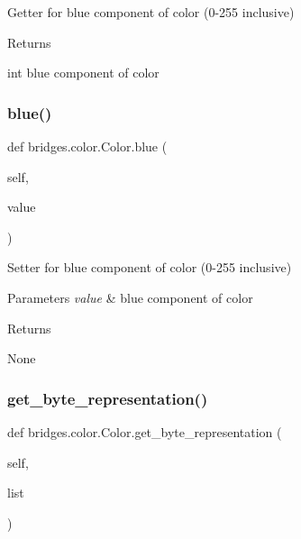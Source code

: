Getter for blue component of color (0-\/255 inclusive) 

\begin{DoxyReturn}{Returns}


int blue component of color 
\end{DoxyReturn}
\mbox{\label{classbridges_1_1color_1_1_color_a0673063270c8a522b086a916f09dd1f5}} 
\subsubsection{\texorpdfstring{blue()}{blue()}\hspace{0.1cm}{\footnotesize\ttfamily [2/2]}}
{\footnotesize\ttfamily def bridges.\+color.\+Color.\+blue (\begin{DoxyParamCaption}\item[{}]{self,  }\item[{}]{value }\end{DoxyParamCaption})}



Setter for blue component of color (0-\/255 inclusive) 


\begin{DoxyParams}{Parameters}
{\em value} & blue component of color \\
\hline
\end{DoxyParams}
\begin{DoxyReturn}{Returns}


None 
\end{DoxyReturn}
\mbox{\label{classbridges_1_1color_1_1_color_a30bc8e2023395c584eb256972abc7c1b}} 
\subsubsection{\texorpdfstring{get\+\_\+byte\+\_\+representation()}{get\_byte\_representation()}}
{\footnotesize\ttfamily def bridges.\+color.\+Color.\+get\+\_\+byte\+\_\+representation (\begin{DoxyParamCaption}\item[{}]{self,  }\item[{}]{list }\end{DoxyParamCaption})}



